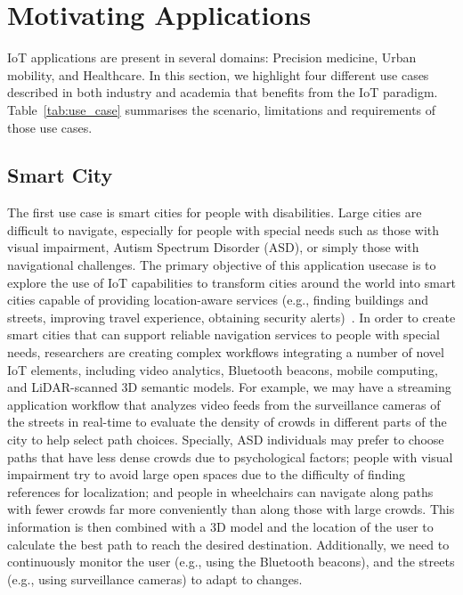 \section{Motivating Applications}\label{sec:usecases} 
IoT applications are present in several domains: Precision medicine, Urban mobility, and Healthcare. In this section, we highlight four different use cases described in both industry and academia that benefits from the IoT paradigm.  Table~\ref{tab:use_case} summarises the scenario, limitations and requirements of those use cases.


\subsection{Smart City}

The first use case is smart cities for people with disabilities. Large cities are difficult to navigate, especially for people with special needs such as those with visual impairment, Autism Spectrum Disorder (ASD), or simply those with navigational challenges. The primary objective of this application usecase is to explore the use of IoT capabilities to transform cities around the world into smart cities capable of providing location-aware services (e.g., finding buildings and streets, improving travel experience, obtaining security alerts)~\cite{smarHubJie}. In order to create smart cities that can support reliable navigation services to people with special needs, researchers are creating complex workflows integrating a number of novel IoT elements, including video analytics, Bluetooth beacons, mobile computing, and LiDAR-scanned 3D semantic models. For example, we may have a streaming application workflow that analyzes video feeds from the surveillance cameras of the streets in real-time to evaluate the density of crowds in different parts of the city to help select path choices. Specially, ASD individuals may prefer to choose paths that have less dense crowds due to psychological factors; people with visual impairment try to avoid large open spaces due to the difficulty of finding references for localization; and people in wheelchairs can navigate along paths with fewer crowds far more conveniently than along those with large crowds. This information is then combined with  a 3D model and the location of the user to calculate the best path to reach the desired destination. Additionally, we need to continuously monitor the user (e.g., using the Bluetooth beacons), and the streets (e.g., using surveillance cameras) to adapt to changes.

